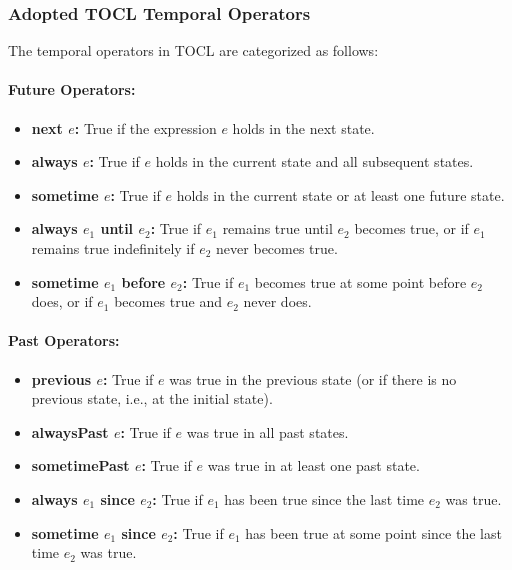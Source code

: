 
\subsubsection{Adopted TOCL Temporal Operators}
The temporal operators in TOCL are categorized as follows:

\paragraph{Future Operators:}
\begin{itemize}
    \item \textbf{next $e$:} True if the expression $e$ holds in the next state.
    
    \item \textbf{always $e$:} True if $e$ holds in the current state and all subsequent states.
    
    \item \textbf{sometime $e$:} True if $e$ holds in the current state or at least one future state.
    
    \item \textbf{always $e_1$ until $e_2$:} True if $e_1$ remains true until $e_2$ becomes true, or if $e_1$ remains true indefinitely if $e_2$ never becomes true.
    
    \item \textbf{sometime $e_1$ before $e_2$:} True if $e_1$ becomes true at some point before $e_2$ does, or if $e_1$ becomes true and $e_2$ never does.
\end{itemize}

\paragraph{Past Operators:}
\begin{itemize}
    \item \textbf{previous $e$:} True if $e$ was true in the previous state (or if there is no previous state, i.e., at the initial state).
    
    \item \textbf{alwaysPast $e$:} True if $e$ was true in all past states.
    
    \item \textbf{sometimePast $e$:} True if $e$ was true in at least one past state.
    
    \item \textbf{always $e_1$ since $e_2$:} True if $e_1$ has been true since the last time $e_2$ was true.
    
    \item \textbf{sometime $e_1$ since $e_2$:} True if $e_1$ has been true at some point since the last time $e_2$ was true.
\end{itemize}


